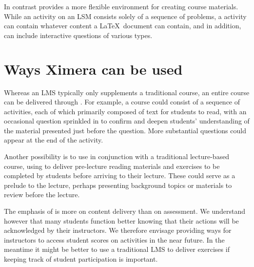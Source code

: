\documentclass{ximera}
\begin{document}
In contrast  provides a more
flexible environment for creating course materials.  While an activity
on an LSM consists solely of a sequence of problems, a
 activity can contain whatever
content a \LaTeX\ document can contain, and in addition, can include
interactive questions of various types.

\section{Ways Ximera can be used}
Whereas an LMS typically only supplements a traditional course, an
entire course can be delivered through
.  For example, a course could
consist of a sequence of 
activities, each of which primarily composed of text for students to
read, with an occasional question sprinkled in to confirm and deepen
students' understanding of the material presented just before the
question.  More substantial questions could appear at the end of the
activity.

Another possibility is to use  in
conjunction with a traditional lecture-based course, using
 to deliver pre-lecture
reading materials and exercises to be completed by students before
arriving to their lecture.  These could serve as a prelude to the
lecture, perhaps presenting background topics or materials to review
before the lecture.

The emphasis of 
is more on content delivery than on assessment.
We understand however that many students function
better knowing that their actions will be acknowledged by
their instructors. We therefore envisage providing ways
for instructors to access student scores on 
 activities
in the near future. In the meantime it might
be better to use a traditional LMS to deliver exercises
if keeping track of student participation is important.
\end{document}
